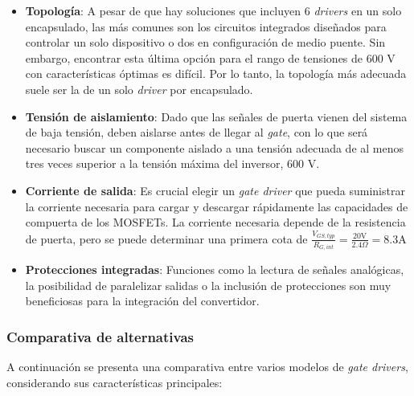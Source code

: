 \begin{itemize}
	\item \textbf{Topología}: A pesar de que hay soluciones que incluyen 6 \textit{drivers} en un solo encapsulado, las más comunes son los circuitos integrados diseñados para controlar un solo dispositivo o dos en configuración de medio puente. Sin embargo, encontrar esta última opción para el rango de tensiones de 600 V con características óptimas es difícil. Por lo tanto, la topología más adecuada suele ser la de un solo \textit{driver} por encapsulado.
	\item \textbf{Tensión de aislamiento}: Dado que las señales de puerta vienen del sistema de baja tensión, deben aislarse antes de llegar al \textit{gate}, con lo que será necesario buscar un componente aislado a una tensión adecuada de al menos tres veces superior a la tensión máxima del inversor, 600 V. 
	\item \textbf{Corriente de salida}: Es crucial elegir un \textit{gate driver} que pueda suministrar la corriente necesaria para cargar y descargar rápidamente las capacidades de compuerta de los MOSFETs. La corriente necesaria depende de la resistencia de puerta, pero se puede determinar una primera cota de $\frac{V_{GS,typ}}{R_{G,int}} = \frac{20 \text{V}}{2.4 \Omega} = 8.3 \text{A}$
	\item \textbf{Protecciones integradas}: Funciones como la lectura de señales analógicas, la posibilidad de paralelizar salidas o la inclusión de protecciones son muy beneficiosas para la integración del convertidor.
\end{itemize}

\subsubsection{Comparativa de alternativas}

A continuación se presenta una comparativa entre varios modelos de \textit{gate drivers}, considerando sus características principales:

